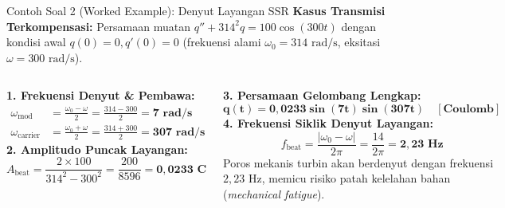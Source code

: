\documentclass[aspectratio=169,10pt]{beamer}
\begin{document}
\begin{frame}{Contoh Soal 2 (Worked Example): Denyut Layangan SSR}
  \textbf{Kasus Transmisi Terkompensasi:} Persamaan muatan $q'' + 314^2 q = 100 \cos(300 t)$ dengan kondisi awal $q(0)=0, q'(0)=0$ (frekuensi alami $\omega_0 = 314\text{ rad/s}$, eksitasi $\omega = 300\text{ rad/s}$).
  \vspace{0.15cm}

  \begin{columns}[t]
    \textbf{1. Frekuensi Denyut \& Pembawa:}
    \begin{align*}
      \omega_{\text{mod}} &= \frac{\omega_0 - \omega}{2} = \frac{314 - 300}{2} = \mathbf{7\text{ rad/s}} \\
      \omega_{\text{carrier}} &= \frac{\omega_0 + \omega}{2} = \frac{314 + 300}{2} = \mathbf{307\text{ rad/s}}
    \end{align*}
    \textbf{2. Amplitudo Puncak Layangan:}
    \begin{equation*}
      A_{\text{beat}} = \frac{2 \times 100}{314^2 - 300^2} = \frac{200}{8596} = \mathbf{0{,}0233\text{ C}}
    \end{equation*}

    \textbf{3. Persamaan Gelombang Lengkap:}
    \begin{equation*}
      \mathbf{q(t) = 0{,}0233 \sin(7 t) \sin(307 t)\quad [\text{Coulomb}]}
    \end{equation*}
    \textbf{4. Frekuensi Siklik Denyut Layangan:}
    \begin{equation*}
      f_{\text{beat}} = \frac{|\omega_0 - \omega|}{2\pi} = \frac{14}{2\pi} = \mathbf{2{,}23\text{ Hz}}
    \end{equation*}
    Poros mekanis turbin akan berdenyut dengan frekuensi $2{,}23\text{ Hz}$, memicu risiko patah kelelahan bahan (\textit{mechanical fatigue}).
  \end{columns}
\end{frame}
\end{document}
